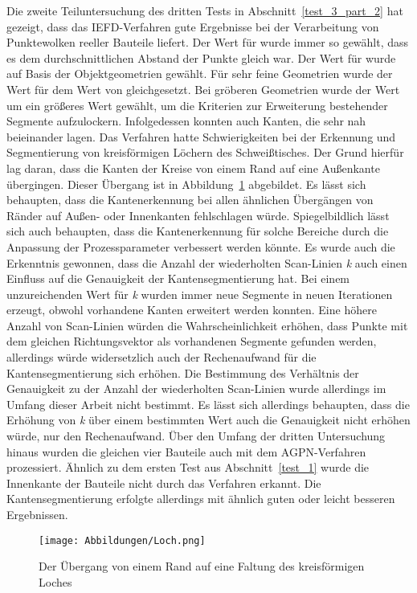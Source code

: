 Die zweite Teiluntersuchung des dritten Tests in Abschnitt~\ref{test_3_part_2} hat gezeigt, dass das IEFD-Verfahren gute Ergebnisse bei der Verarbeitung von Punktewolken reeller Bauteile liefert. Der Wert für \distthresha wurde immer so gewählt, dass es dem durchschnittlichen Abstand der Punkte gleich war. Der Wert für \distthreshb wurde auf Basis der Objektgeometrien gewählt. Für sehr feine Geometrien wurde der Wert für \distthreshb dem Wert von \distthresha gleichgesetzt. Bei gröberen Geometrien wurde der Wert um ein größeres Wert gewählt, um die Kriterien zur Erweiterung bestehender Segmente aufzulockern. Infolgedessen konnten auch Kanten, die sehr nah beieinander lagen. Das Verfahren hatte  Schwierigkeiten bei der Erkennung und Segmentierung von kreisförmigen Löchern des Schweißtisches. Der Grund hierfür lag daran, dass die Kanten der Kreise von einem Rand auf eine Außenkante übergingen. Dieser Übergang ist in Abbildung~\ref{fig: Loch} abgebildet. Es lässt sich behaupten, dass die Kantenerkennung bei allen ähnlichen Übergängen von Ränder auf Außen- oder Innenkanten fehlschlagen würde. Spiegelbildlich lässt sich auch behaupten, dass die Kantenerkennung für solche Bereiche durch die Anpassung der Prozessparameter verbessert werden könnte. Es wurde auch die Erkenntnis gewonnen, dass die Anzahl der wiederholten Scan-Linien \textit{k} auch einen Einfluss auf die Genauigkeit der Kantensegmentierung hat. Bei einem unzureichenden Wert für \textit{k} wurden immer neue Segmente in neuen Iterationen erzeugt, obwohl vorhandene Kanten erweitert werden konnten. Eine höhere Anzahl von Scan-Linien würden die Wahrscheinlichkeit erhöhen, dass Punkte mit dem gleichen Richtungsvektor als vorhandenen Segmente gefunden werden, allerdings würde widersetzlich auch der Rechenaufwand für die Kantensegmentierung sich erhöhen. Die Bestimmung des Verhältnis der Genauigkeit zu der Anzahl der wiederholten Scan-Linien wurde allerdings im Umfang dieser Arbeit nicht bestimmt. Es lässt sich allerdings behaupten, dass die Erhöhung von \textit{k} über einem bestimmten Wert auch die Genauigkeit nicht erhöhen würde, nur den Rechenaufwand. Über den Umfang der dritten Untersuchung hinaus wurden die gleichen vier Bauteile auch mit dem AGPN-Verfahren prozessiert. Ähnlich zu dem ersten Test aus Abschnitt~\ref{test_1} wurde die Innenkante der Bauteile nicht durch das Verfahren erkannt. Die Kantensegmentierung erfolgte allerdings mit ähnlich guten oder leicht besseren Ergebnissen. 

\begin{figure}[t]
	\texttt{[image: Abbildungen/Loch.png]}
	\centering
	\caption{Der Übergang von einem Rand auf eine Faltung des kreisförmigen Loches}
	\label{fig: Loch}
\end{figure}

